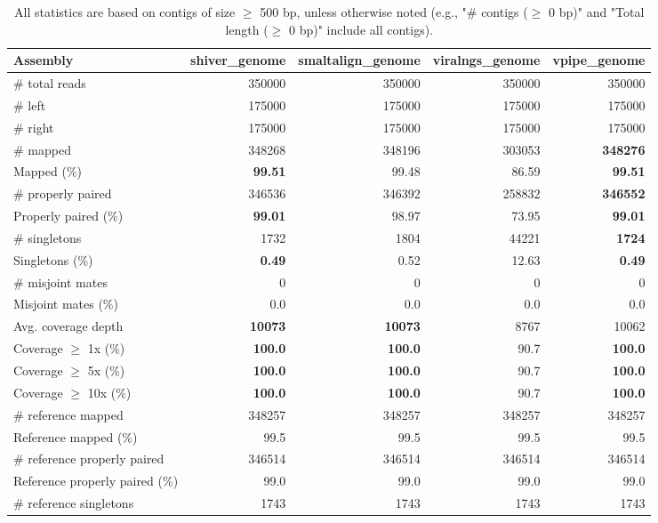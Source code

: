 \documentclass[12pt,a4paper]{article}
\begin{document}
\begin{table}[ht]
\begin{center}
\caption{All statistics are based on contigs of size $\geq$ 500 bp, unless otherwise noted (e.g., "\# contigs ($\geq$ 0 bp)" and "Total length ($\geq$ 0 bp)" include all contigs).}
\begin{tabular}{|l*{4}{|r}|}
\hline
Assembly & shiver\_genome & smaltalign\_genome & viralngs\_genome & vpipe\_genome \\ \hline
\# total reads & 350000 & 350000 & 350000 & 350000 \\ \hline
\# left & 175000 & 175000 & 175000 & 175000 \\ \hline
\# right & 175000 & 175000 & 175000 & 175000 \\ \hline
\# mapped & 348268 & 348196 & 303053 & {\bf 348276} \\ \hline
Mapped (\%) & {\bf 99.51} & 99.48 & 86.59 & {\bf 99.51} \\ \hline
\# properly paired & 346536 & 346392 & 258832 & {\bf 346552} \\ \hline
Properly paired (\%) & {\bf 99.01} & 98.97 & 73.95 & {\bf 99.01} \\ \hline
\# singletons & 1732 & 1804 & 44221 & {\bf 1724} \\ \hline
Singletons (\%) & {\bf 0.49} & 0.52 & 12.63 & {\bf 0.49} \\ \hline
\# misjoint mates & 0 & 0 & 0 & 0 \\ \hline
Misjoint mates (\%) & 0.0 & 0.0 & 0.0 & 0.0 \\ \hline
Avg. coverage depth & {\bf 10073} & {\bf 10073} & 8767 & 10062 \\ \hline
Coverage $\geq$ 1x (\%) & {\bf 100.0} & {\bf 100.0} & 90.7 & {\bf 100.0} \\ \hline
Coverage $\geq$ 5x (\%) & {\bf 100.0} & {\bf 100.0} & 90.7 & {\bf 100.0} \\ \hline
Coverage $\geq$ 10x (\%) & {\bf 100.0} & {\bf 100.0} & 90.7 & {\bf 100.0} \\ \hline
\# reference mapped & 348257 & 348257 & 348257 & 348257 \\ \hline
Reference mapped (\%) & 99.5 & 99.5 & 99.5 & 99.5 \\ \hline
\# reference properly paired & 346514 & 346514 & 346514 & 346514 \\ \hline
Reference properly paired (\%) & 99.0 & 99.0 & 99.0 & 99.0 \\ \hline
\# reference singletons & 1743 & 1743 & 1743 & 1743 \\ \hline

\end{tabular}
\end{center}
\end{table}
\end{document}
